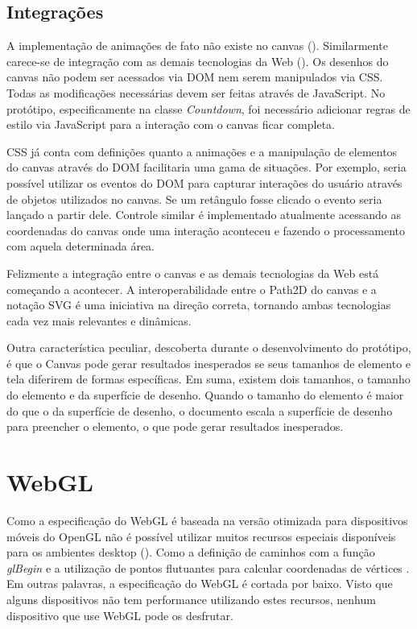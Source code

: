 \subsection{Integrações}

A implementação de animações de fato não existe no canvas
(). Similarmente carece-se de integração
com as demais tecnologias da Web ().
Os desenhos do canvas não podem ser acessados via DOM nem serem
manipulados via CSS. Todas as modificações necessárias devem ser
feitas através de JavaScript. No protótipo, especificamente na classe
\textit{Countdown}, foi necessário adicionar regras de estilo via
JavaScript para a interação com o canvas ficar completa.

CSS já conta com definições quanto a animações e a manipulação de
elementos do canvas através do DOM facilitaria uma gama de situações.
Por exemplo, seria possível utilizar os eventos do DOM para capturar
interações do usuário através de objetos utilizados no canvas.
Se um retângulo fosse clicado o evento seria lançado a partir dele.
Controle similar é implementado atualmente acessando as coordenadas
do canvas onde uma interação aconteceu e fazendo o processamento com
aquela determinada área.

Felizmente a integração entre o canvas e as demais tecnologias da
Web está começando a acontecer. A interoperabilidade entre o Path2D
do canvas e a notação SVG é uma iniciativa na direção correta,
tornando ambas tecnologias cada vez mais relevantes e dinâmicas.

Outra característica peculiar, descoberta durante o desenvolvimento
do protótipo, é que o Canvas pode gerar resultados inesperados se
seus tamanhos de elemento e tela diferirem de formas específicas. Em
suma, existem dois tamanhos, o tamanho do elemento e da superfície de
desenho. Quando o tamanho do elemento é maior do que o da superfície
de desenho, o documento escala a superfície de desenho para preencher o
elemento, o que pode gerar resultados inesperados.

\section{WebGL}

Como a especificação do WebGL é baseada na versão otimizada
para dispositivos móveis do OpenGL não é possível utilizar
muitos recursos especiais disponíveis para os ambientes desktop
(). Como a definição de caminhos
com a função \textit{glBegin} e a utilização de pontos flutuantes
para calcular coordenadas de vértices \autocite{esVsGl}. Em outras
palavras, a especificação do WebGL é cortada por baixo. Visto que
alguns dispositivos não tem performance utilizando estes recursos,
nenhum dispositivo que use WebGL pode os desfrutar.

